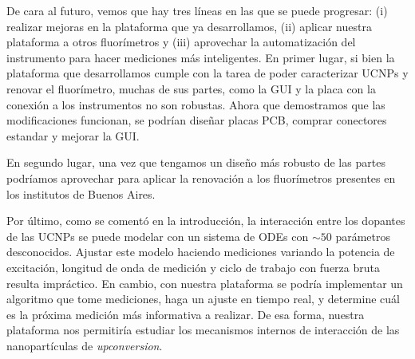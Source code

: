 De cara al futuro, vemos que hay tres líneas en las que se puede progresar: (i) realizar mejoras en la plataforma que ya desarrollamos, (ii) aplicar nuestra plataforma a otros fluorímetros y (iii) aprovechar la automatización del instrumento para hacer mediciones más inteligentes.
En primer lugar, si bien la plataforma que desarrollamos cumple con la tarea de poder caracterizar UCNPs y renovar el fluorímetro, muchas de sus partes, como la GUI y la placa con la conexión a los instrumentos no son robustas.
Ahora que demostramos que las modificaciones funcionan, se podrían diseñar placas PCB, comprar conectores estandar y mejorar la GUI.

En segundo lugar, una vez que tengamos un diseño más robusto de las partes podríamos aprovechar para aplicar la renovación a los fluorímetros presentes en los institutos de Buenos Aires.

Por último, como se comentó en la introducción, la interacción entre los dopantes de las UCNPs se puede modelar con un sistema de ODEs con $\sim 50$ parámetros desconocidos.
Ajustar este modelo haciendo mediciones variando la potencia de excitación, longitud de onda de medición y ciclo de trabajo con fuerza bruta resulta impráctico.
En cambio, con nuestra plataforma se podría implementar un algoritmo que tome mediciones, haga un ajuste en tiempo real, y determine cuál es la próxima medición más informativa a realizar.
De esa forma, nuestra plataforma nos permitiría estudiar los mecanismos internos de interacción de las nanopartículas de \textit{upconversion}. 


